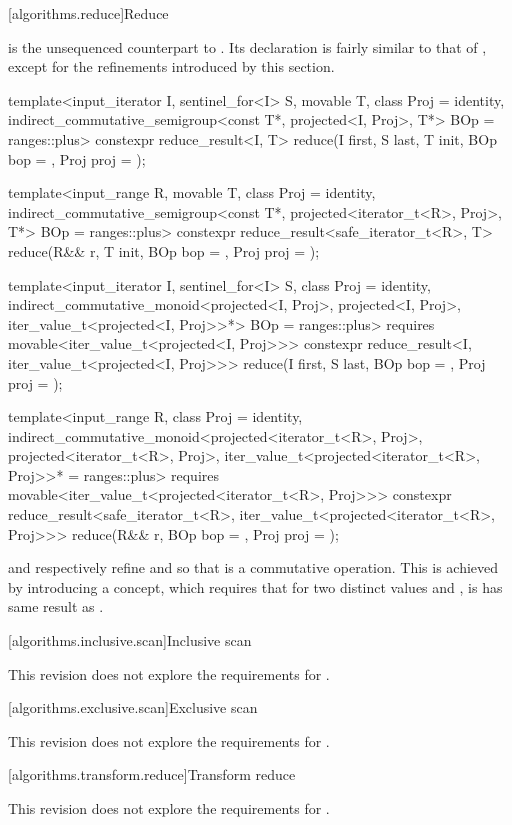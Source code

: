 [algorithms.reduce]{Reduce}

 is the unsequenced counterpart to . Its declaration is fairly
similar to that of , except for the refinements introduced by this section.

\begin{codeblock}
template<input_iterator I, sentinel_for<I> S, movable T, class Proj = identity,
         indirect_commutative_semigroup<const T*, projected<I, Proj>, T*> BOp = ranges::plus>
constexpr reduce_result<I, T>
  reduce(I first, S last, T init, BOp bop = {}, Proj proj = {});

template<input_range R, movable T, class Proj = identity,
         indirect_commutative_semigroup<const T*,
                                        projected<iterator_t<R>, Proj>, T*> BOp = ranges::plus>
constexpr reduce_result<safe_iterator_t<R>, T>
  reduce(R&& r, T init, BOp bop = {}, Proj proj = {});

template<input_iterator I, sentinel_for<I> S, class Proj = identity,
         indirect_commutative_monoid<projected<I, Proj>, projected<I, Proj>,
                                     iter_value_t<projected<I, Proj>>*> BOp = ranges::plus>
requires movable<iter_value_t<projected<I, Proj>>>
constexpr reduce_result<I, iter_value_t<projected<I, Proj>>>
  reduce(I first, S last, BOp bop = {}, Proj proj = {});

template<input_range R, class Proj = identity,
         indirect_commutative_monoid<projected<iterator_t<R>, Proj>,
                                     projected<iterator_t<R>, Proj>,
                                     iter_value_t<projected<iterator_t<R>, Proj>>* = ranges::plus>
requires movable<iter_value_t<projected<iterator_t<R>, Proj>>>
constexpr reduce_result<safe_iterator_t<R>, iter_value_t<projected<iterator_t<R>, Proj>>>
  reduce(R&& r, BOp bop = {}, Proj proj = {});
\end{codeblock}

 and  respectively refine 
and  so that  is a commutative operation. This is achieved by introducing a
 concept, which requires that for two distinct values  and
,  is has same result as .


[algorithms.inclusive.scan]{Inclusive scan}

This revision does not explore the requirements for .

[algorithms.exclusive.scan]{Exclusive scan}

This revision does not explore the requirements for .

[algorithms.transform.reduce]{Transform reduce}

This revision does not explore the requirements for .
